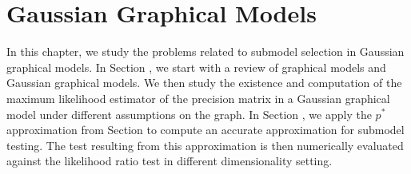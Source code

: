\section{Gaussian Graphical Models}

In this chapter, we study the problems related to submodel selection in Gaussian graphical models. In Section , we start with a review of graphical models and Gaussian graphical models. We then study the existence and computation of the maximum likelihood estimator of the precision matrix in a Gaussian graphical model under different assumptions on the graph. In Section , we apply the $p^*$ approximation from Section  to compute an accurate approximation for submodel testing. The test resulting from this approximation is then numerically evaluated against the likelihood ratio test in different dimensionality setting.







